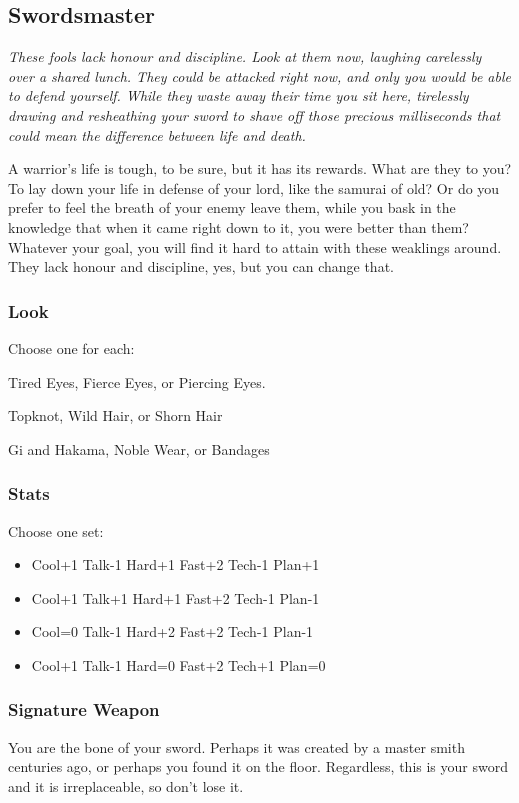 \subsection{Swordsmaster}
{\itshape These fools lack honour and discipline. Look at them now, laughing carelessly over a shared lunch. They could be attacked right now, and only you would be able to defend yourself. While they waste away their time you sit here, tirelessly drawing and resheathing your sword to shave off those precious milliseconds that could mean the difference between life and death.

A warrior's life is tough, to be sure, but it has its rewards. What are they to you? To lay down your life in defense of your lord, like the samurai of old? Or do you prefer to feel the breath of your enemy leave them, while you bask in the knowledge that when it came right down to it, you were better than them? Whatever your goal, you will find it hard to attain with these weaklings around. They lack honour and discipline, yes, but you can change that.}

\subsubsection{Look}

Choose one for each:

Tired Eyes, Fierce Eyes, or Piercing Eyes.

Topknot, Wild Hair, or Shorn Hair

Gi and Hakama, Noble Wear, or Bandages

\subsubsection{Stats}
Choose one set:
\begin{itemize}
\setlength\itemsep{0em}
\item Cool+1 Talk-1 Hard+1 Fast+2 Tech-1 Plan+1
\item Cool+1 Talk+1 Hard+1 Fast+2 Tech-1 Plan-1
\item Cool=0 Talk-1 Hard+2 Fast+2 Tech-1 Plan-1
\item Cool+1 Talk-1 Hard=0 Fast+2 Tech+1 Plan=0
\end{itemize}

\subsubsection{Signature Weapon}
You are the bone of your sword. Perhaps it was created by a master smith centuries ago, or perhaps you found it on the floor. Regardless, this is your sword and it is irreplaceable, so don't lose it.

